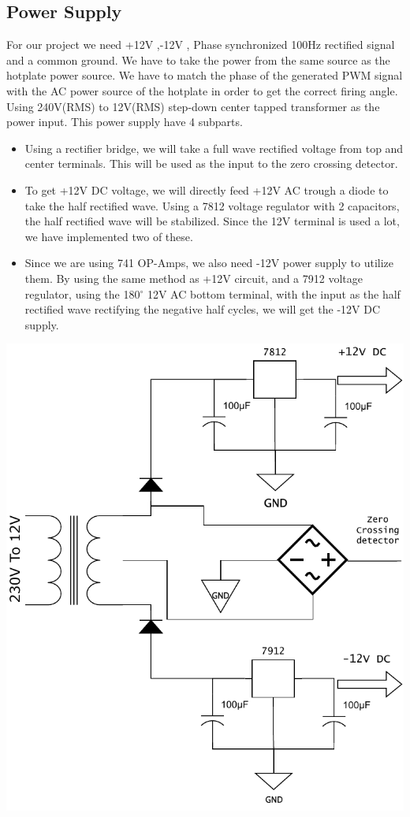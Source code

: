 \begin{multicols}{2}
\section{Power Supply}
For our project we need +12V ,-12V , Phase synchronized 100Hz rectified signal and a common ground. We have to take the power from the same source as the hotplate power source. We have to match the phase of the generated PWM signal with the AC power source of the hotplate in order to get the correct firing angle. Using 240V(RMS) to 12V(RMS) step-down center tapped transformer as the power input. This power supply have 4 subparts. 
\begin{itemize}[leftmargin=*]
    \item Using a rectifier bridge, we will take a full wave rectified voltage from top and center terminals. This will be used as the input to the zero crossing detector.
    \item To get +12V DC voltage, we will directly feed +12V AC trough a diode to take the half rectified wave. Using a 7812 voltage regulator with 2 capacitors, the half rectified wave will be stabilized. Since the 12V terminal is used a lot, we have implemented two of these.
    \item Since we are using 741 OP-Amps, we also need -12V power supply to utilize them. By using the same method as +12V circuit, and a 7912 voltage regulator, using the 180$^{\circ}$ 12V AC bottom terminal, with the input as the half rectified wave rectifying the negative half cycles, we will get the -12V DC supply.
\end{itemize}
\begin{minipage}{0.45\textwidth}
\centering
\includegraphics[width=\textwidth]{Method/Power supply.pdf}
\end{minipage}


\end{multicols}
